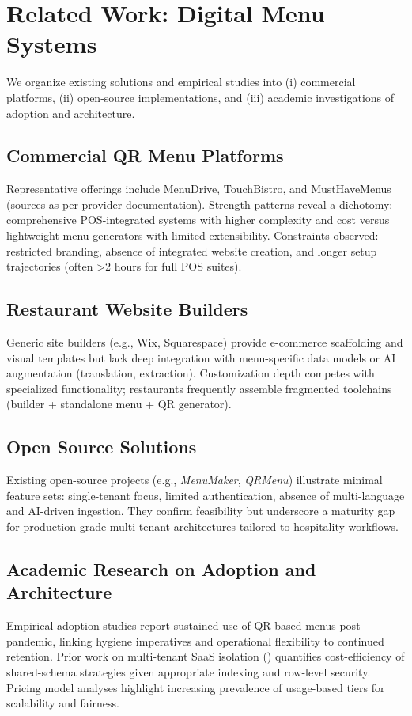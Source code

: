 \section{Related Work: Digital Menu Systems}\label{sec:related}
We organize existing solutions and empirical studies into (i) commercial platforms, (ii) open-source implementations, and (iii) academic investigations of adoption and architecture.

\subsection{Commercial QR Menu Platforms}
Representative offerings include MenuDrive, TouchBistro, and MustHaveMenus (sources as per provider documentation). Strength patterns reveal a dichotomy: comprehensive POS-integrated systems with higher complexity and cost versus lightweight menu generators with limited extensibility. Constraints observed: restricted branding, absence of integrated website creation, and longer setup trajectories (often \textgreater{}2 hours for full POS suites).

\subsection{Restaurant Website Builders}
Generic site builders (e.g., Wix, Squarespace) provide e-commerce scaffolding and visual templates but lack deep integration with menu-specific data models or AI augmentation (translation, extraction). Customization depth competes with specialized functionality; restaurants frequently assemble fragmented toolchains (builder + standalone menu + QR generator).

\subsection{Open Source Solutions}
Existing open-source projects (e.g., \emph{MenuMaker}, \emph{QRMenu}) illustrate minimal feature sets: single-tenant focus, limited authentication, absence of multi-language and AI-driven ingestion. They confirm feasibility but underscore a maturity gap for production-grade multi-tenant architectures tailored to hospitality workflows.

\subsection{Academic Research on Adoption and Architecture}
Empirical adoption studies report sustained use of QR-based menus post-pandemic, linking hygiene imperatives and operational flexibility to continued retention. Prior work on multi-tenant SaaS isolation (\cite{guo2020}) quantifies cost-efficiency of shared-schema strategies given appropriate indexing and row-level security. Pricing model analyses highlight increasing prevalence of usage-based tiers for scalability and fairness.

